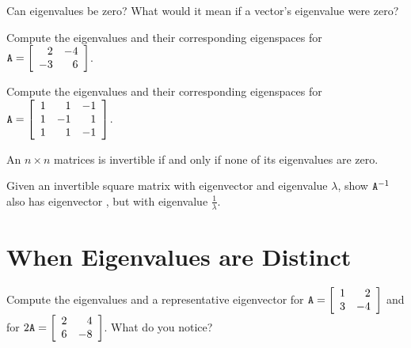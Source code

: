 \noindent {} Can eigenvalues be zero? What would it mean if a vector's eigenvalue were zero?

\begin{myexb}[\bd{b}]
		Compute the eigenvalues and their corresponding eigenspaces for   $\texttt{A} = \left[ \begin{array}{rr}  2 & -4 \\ -3 & 6  \end{array} \right]$.
\end{myexb}

\begin{myexc}[\bd{c}]
		Compute the eigenvalues and their corresponding eigenspaces for  $\texttt{A} = \left[ \begin{array}{rrr} 1 & 1 & -1 \\ 1 & -1 & 1 \\ 1 & 1 & -1 \end{array} \right]$.
\end{myexc}

\begin{theorem}
	 An $n \times n$ matrices  is invertible if and only if none of its eigenvalues are zero.  
\end{theorem}
\vspace{-.3in}\hspace{5in}\begin{annotation}
\end{annotation}

\vspace{.5cm}

\noindent {} Given an invertible square matrix  with eigenvector  and eigenvalue $\lambda$, show $\texttt{A}^{-1}$ also has eigenvector , but with eigenvalue $\frac{1}{\lambda}$. 

\vspace{.5cm}

\section{When Eigenvalues are Distinct}    \label{When Eigenvalues are Distinct}

\begin{myexa}[\bd{a}]
	Compute the eigenvalues and a representative eigenvector for   $\texttt{A} = \left[ \begin{array}{rr}  1 & 2 \\ 3 & -4  \end{array} \right]$ and for  $2\texttt{A} = \left[ \begin{array}{rr}  2 & 4 \\ 6 & -8  \end{array} \right]$. What do you notice?
\end{myexa} 

